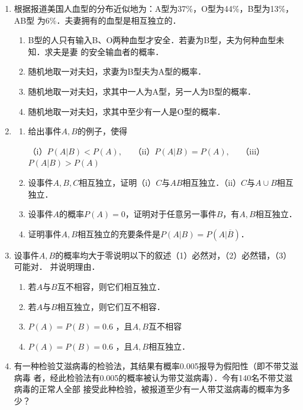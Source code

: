 \documentclass[10pt,a4paper]{article}
\begin{document}
\begin{enumerate}
    \item 根据报道美国人血型的分布近似地为：A型为37\%，O型为44\%，B型为13\%，AB型
    为6\%．夫妻拥有的血型是相互独立的．
    \begin{enumerate}
        \item B型的人只有输入B、O两种血型才安全．若妻为B型，夫为何种血型未知．求夫是妻
        的安全输血者的概率．
        \item 随机地取一对夫妇，求妻为B型夫为A型的概率．
        \item 随机地取一对夫妇，求其中一人为A型，另一人为B型的概率．
        \item 随机地取一对夫妇，求其中至少有一人是O型的概率．
    \end{enumerate}



    \item \begin{enumerate}
        \item 给出事件$A,B$的例子，使得
        

        （i）$P(A|B)<P(A),\quad$ （ii）$P(A|B)=P(A),\quad$ （iii）$P(A|B)>P(A)$
        \item 设事件$A,B,C$相互独立，证明（i）$C$与$AB$相互独立．（ii）$C$与$A\cup B$相互独立．
        \item 设事件$A$的概率$P(A)=0$，证明对于任意另一事件$B$，有$A,B$相互独立．
        \item 证明事件$A,B$相互独立的充要条件是$P(A|B)=P(A|\overline{B})$．
    \end{enumerate}



    \item 设事件$A,B$的概率均大于零说明以下的叙述（1）必然对，（2）必然错，（3）可能对．
    并说明理由．
    \begin{enumerate}
        \item 若$A$与$B$互不相容，则它们相互独立．
        \item 若$A$与$B$相互独立，则它们互不相容．
        \item $P(A)=P(B)=0.6$ ，且$A,B$互不相容
        \item $P(A)=P(B)=0.6$ ，且$A,B$相互独立．
    \end{enumerate}


    \item 有一种检验艾滋病毒的检验法，其结果有概率0.005报导为假阳性（即不带艾滋病毒
    者，经此检验法有0.005的概率被认为带艾滋病毒）．今有140名不带艾滋病毒的正常人全部
    接受此种检验，被报道至少有一人带艾滋病毒的概率为多少？




\end{enumerate}
\end{document}
